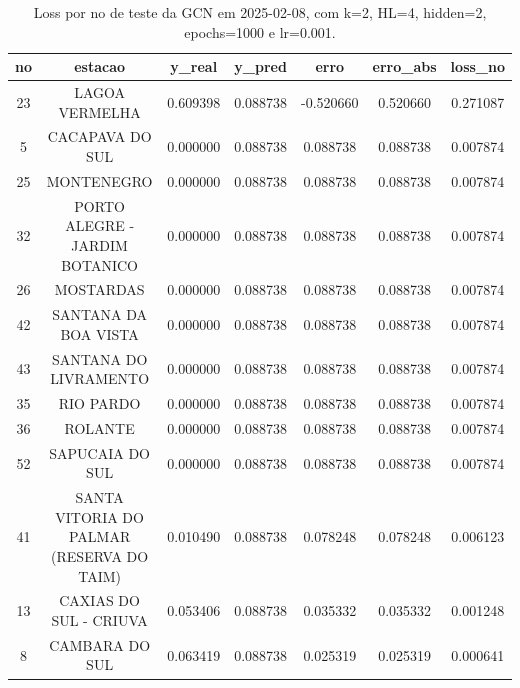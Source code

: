 \begin{table}[h]
\centering
\caption{Loss por no de teste da GCN em 2025-02-08, com k=2, HL=4, hidden=2, epochs=1000 e lr=0.001.}
\label{tab:gcn_loss_k2_hl4_h2_e1000_d20250208}
\begin{tabular}{ccccccc}
\toprule
no & estacao & y\_real & y\_pred & erro & erro\_abs & loss\_no \\
\midrule
23 & LAGOA VERMELHA & 0.609398 & 0.088738 & -0.520660 & 0.520660 & 0.271087 \\
5 & CACAPAVA DO SUL & 0.000000 & 0.088738 & 0.088738 & 0.088738 & 0.007874 \\
25 & MONTENEGRO & 0.000000 & 0.088738 & 0.088738 & 0.088738 & 0.007874 \\
32 & PORTO ALEGRE - JARDIM BOTANICO & 0.000000 & 0.088738 & 0.088738 & 0.088738 & 0.007874 \\
26 & MOSTARDAS & 0.000000 & 0.088738 & 0.088738 & 0.088738 & 0.007874 \\
42 & SANTANA DA BOA VISTA & 0.000000 & 0.088738 & 0.088738 & 0.088738 & 0.007874 \\
43 & SANTANA DO LIVRAMENTO & 0.000000 & 0.088738 & 0.088738 & 0.088738 & 0.007874 \\
35 & RIO PARDO & 0.000000 & 0.088738 & 0.088738 & 0.088738 & 0.007874 \\
36 & ROLANTE & 0.000000 & 0.088738 & 0.088738 & 0.088738 & 0.007874 \\
52 & SAPUCAIA DO SUL & 0.000000 & 0.088738 & 0.088738 & 0.088738 & 0.007874 \\
41 & SANTA VITORIA DO PALMAR (RESERVA DO TAIM) & 0.010490 & 0.088738 & 0.078248 & 0.078248 & 0.006123 \\
13 & CAXIAS DO SUL - CRIUVA & 0.053406 & 0.088738 & 0.035332 & 0.035332 & 0.001248 \\
8 & CAMBARA DO SUL & 0.063419 & 0.088738 & 0.025319 & 0.025319 & 0.000641 \\
\bottomrule
\end{tabular}
\end{table}
